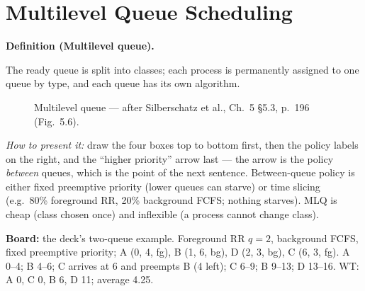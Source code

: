 \documentclass[11pt]{article}
\newenvironment{definitionbox}[1]{%
  \par\noindent\textbf{Definition (#1).}\ \itshape
}{\par\vspace{0.3em}}
\begin{document}
\section{Multilevel Queue Scheduling}

\begin{definitionbox}{Multilevel queue}
The ready queue is split into classes; each process is permanently assigned to one queue by type, and each queue has its own algorithm.
\end{definitionbox}

\begin{figure}[h]
\centering
\caption{Multilevel queue --- after Silberschatz et al., Ch.~5 \S5.3, p.~196 (Fig.~5.6).}
\end{figure}

\emph{How to present it:} draw the four boxes top to bottom first, then the policy labels on the right, and the ``higher priority'' arrow last --- the arrow is the policy \emph{between} queues, which is the point of the next sentence. Between-queue policy is either fixed preemptive priority (lower queues can starve) or time slicing (e.g.\ 80\% foreground RR, 20\% background FCFS; nothing starves). MLQ is cheap (class chosen once) and inflexible (a process cannot change class).

\textbf{Board:} the deck's two-queue example. Foreground RR $q=2$, background FCFS, fixed preemptive priority; A (0, 4, fg), B (1, 6, bg), D (2, 3, bg), C (6, 3, fg). A 0--4; B 4--6; C arrives at 6 and preempts B (4 left); C 6--9; B 9--13; D 13--16. WT: A 0, C 0, B 6, D 11; average 4.25.
\end{document}
